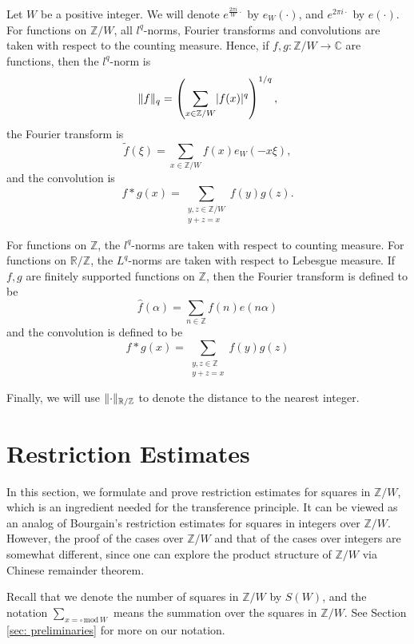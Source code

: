 \documentclass[11pt]{amsart}
\theoremstyle{plain} %
\theoremstyle{remark}
\numberwithin{equation}{section}
\newcommand{\R}{\mathbb{R}}
\newcommand{\C}{\mathbb{C}}
\newcommand{\Z}{\mathbb{Z}}
\DeclarePairedDelimiter\abs{\lvert}{\rvert}
\DeclarePairedDelimiter\norm{\lVert}{\rVert}
\newcommand{\sqw}[1]{\sum_{#1=\square\,\mathrm{mod}\,W}}
\begin{document}
Let $W$ be a positive integer. We will denote $e^{\frac{2\pi i}{W}\cdot}$ by $e_W(\cdot)$, and $e^{2\pi i\cdot}$ by $e(\cdot)$. For functions on $\Z/W$, all $l^q$-norms, Fourier transforms and convolutions are taken with respect to the counting measure. Hence, if $f,g:\Z/W\longrightarrow\C$ are functions, then the $l^q$-norm is
\begin{equation*}
    \norm{f}_q=\left(\sum_{x\in\Z/W}\abs{f(x)}^q\right)^{1/q},
\end{equation*}
the Fourier transform is
\begin{equation*}
    \widetilde{f}(\xi)=\sum_{x\in\Z/W}f(x)e_W(-x\xi),
\end{equation*}
and the convolution is
\begin{equation*}
    f*g(x)=\sum_{\substack{y,z\in\Z/W\\y+z=x}}f(y)g(z).
\end{equation*}

For functions on $\Z$, the $l^q$-norms are taken with respect to counting measure. For functions on $\R/\Z$, the $L^q$-norms are taken with respect to Lebesgue measure. If $f,g$ are finitely supported functions on $\Z$, then the Fourier transform is defined to be
\begin{equation*}
    \widehat{f}(\alpha)=\sum_{n\in \Z}f(n)e(n\alpha)
\end{equation*}
and the convolution is defined to be
\begin{equation*}
    f*g(x)=\sum_{\substack{y,z\in \Z\\y+z=x}}f(y)g(z)
\end{equation*}

Finally, we will use $\norm{\cdot}_{\R/\Z}$ to denote the distance to the nearest integer.

\section{Restriction Estimates}\label{sec: restriction}

In this section, we formulate and prove restriction estimates for squares in $\Z/W$, which is an ingredient needed for the transference principle. It can be viewed as an analog of Bourgain's restriction estimates for squares in integers \cite{Bourgain} over $\Z/W$. However, the proof of the cases over $\Z/W$ and that of the cases over integers are somewhat different, since one can explore the product structure of $\Z/W$ via Chinese remainder theorem.

Recall that we denote the number of squares in $\Z/W$ by $S(W)$, and the notation $\sqw{x}$ means the summation over the squares in $\Z/W$. See Section \ref{sec: preliminaries} for more on our notation.
\end{document}
